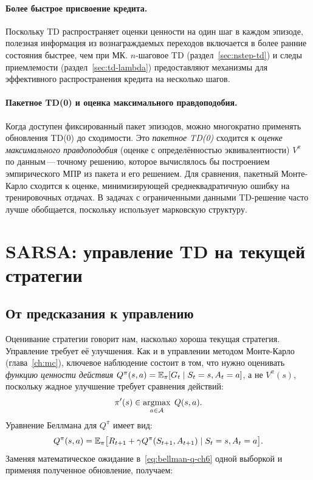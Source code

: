 \paragraph{Более быстрое присвоение кредита.}
Поскольку TD распространяет оценки ценности на один шаг в каждом эпизоде, полезная информация из вознаграждаемых переходов включается в более ранние состояния быстрее, чем при МК.  $n$-шаговое TD (раздел~\ref{sec:nstep-td}) и следы приемлемости (раздел~\ref{sec:td-lambda}) предоставляют механизмы для эффективного распространения кредита на несколько шагов.

\paragraph{Пакетное TD(0) и оценка максимального правдоподобия.}
Когда доступен фиксированный пакет эпизодов, можно многократно применять обновления TD(0) до сходимости.  Это \emph{пакетное TD(0)} сходится к \emph{оценке максимального правдоподобия} (оценке с определённостью эквивалентности) $V^\pi$ по данным\,---\,точному решению, которое вычислялось бы построением эмпирического МПР из пакета и его решением.  Для сравнения, пакетный Монте-Карло сходится к оценке, минимизирующей среднеквадратичную ошибку на тренировочных отдачах.  В задачах с ограниченными данными TD-решение часто лучше обобщается, поскольку использует марковскую структуру.

\section{SARSA: управление TD на текущей стратегии}
\label{sec:sarsa}

\subsection{От предсказания к управлению}

Оценивание стратегии говорит нам, насколько хороша текущая стратегия.  Управление требует её улучшения.  Как и в управлении методом Монте-Карло (глава~\ref{ch:mc}), ключевое наблюдение состоит в том, что нужно оценивать \emph{функцию ценности действия} $Q^\pi(s,a) = \operatorname{\mathbb{E}}_\pi[G_t \mid S_t=s, A_t=a]$, а не $V^\pi(s)$, поскольку жадное улучшение требует сравнения действий:
\[
\pi'(s) \in \operatorname*{argmax}_{a\in\mathcal{A}}\; Q(s,a).
\]
Уравнение Беллмана для $Q^\pi$ имеет вид:
\begin{equation}
\label{eq:bellman-q-ch6}
Q^\pi(s,a) = \operatorname{\mathbb{E}}_\pi\bigl[R_{t+1} + \gamma Q^\pi(S_{t+1},A_{t+1}) \mid S_t=s, A_t=a\bigr].
\end{equation}
Заменяя математическое ожидание в~\eqref{eq:bellman-q-ch6} одной выборкой и применяя полученное обновление, получаем:

